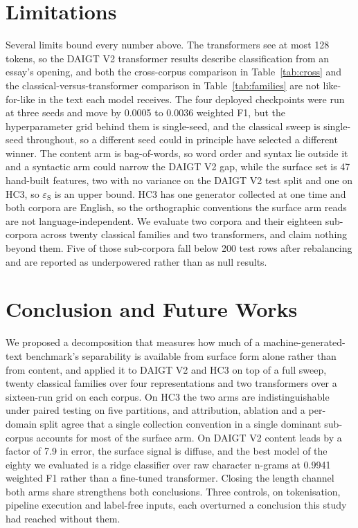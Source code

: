 \documentclass[conference,a4paper]{IEEEtran}
\begin{document}
\section{Limitations}
\label{sec:limitations}

Several limits bound every number above. The transformers see at most 128 tokens, so the DAIGT V2 transformer results describe classification from an essay's opening, and both the cross-corpus comparison in Table~\ref{tab:cross} and the classical-versus-transformer comparison in Table~\ref{tab:families} are not like-for-like in the text each model receives. The four deployed checkpoints were run at three seeds and move by 0.0005 to 0.0036 weighted F1, but the hyperparameter grid behind them is single-seed, and the classical sweep is single-seed throughout, so a different seed could in principle have selected a different winner. The content arm is bag-of-words, so word order and syntax lie outside it and a syntactic arm could narrow the DAIGT V2 gap, while the surface set is 47 hand-built features, two with no variance on the DAIGT V2 test split and one on HC3, so $\varepsilon_{\mathrm{S}}$ is an upper bound. HC3 has one generator collected at one time and both corpora are English, so the orthographic conventions the surface arm reads are not language-independent. We evaluate two corpora and their eighteen sub-corpora across twenty classical families and two transformers, and claim nothing beyond them. Five of those sub-corpora fall below 200 test rows after rebalancing and are reported as underpowered rather than as null results.

\section{Conclusion and Future Works}
\label{sec:conclusion}

We proposed a decomposition that measures how much of a machine-generated-text benchmark's separability is available from surface form alone rather than from content, and applied it to DAIGT V2 and HC3 on top of a full sweep, twenty classical families over four representations and two transformers over a sixteen-run grid on each corpus. On HC3 the two arms are indistinguishable under paired testing on five partitions, and attribution, ablation and a per-domain split agree that a single collection convention in a single dominant sub-corpus accounts for most of the surface arm. On DAIGT V2 content leads by a factor of 7.9 in error, the surface signal is diffuse, and the best model of the eighty we evaluated is a ridge classifier over raw character n-grams at 0.9941 weighted F1 rather than a fine-tuned transformer. Closing the length channel both arms share strengthens both conclusions. Three controls, on tokenisation, pipeline execution and label-free inputs, each overturned a conclusion this study had reached without them.
\end{document}
